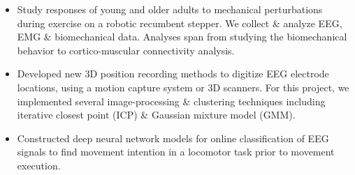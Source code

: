 \documentclass[10pt,letter,ragged2e]{altacv}
\begin{document}

\begin{fullwidth}
\makecvheader
\end{fullwidth}



\begin{itemize}
\item Study responses of young and older adults to mechanical perturbations during exercise on a robotic recumbent stepper. We collect \& analyze EEG, EMG \& biomechanical data. Analyses span from studying the biomechanical behavior to cortico-muscular connectivity analysis.
\item Developed new 3D position recording methods to digitize EEG electrode locations, using a motion capture system or 3D scanners. For this project, we implemented several image-processing \& clustering techniques including iterative closest point (ICP) \& Gaussian mixture model (GMM).
\smallskip
\item Constructed deep neural network models for online classification of EEG signals to find movement intention in a locomotor task prior to movement execution.
\end{itemize}
\end{document}
